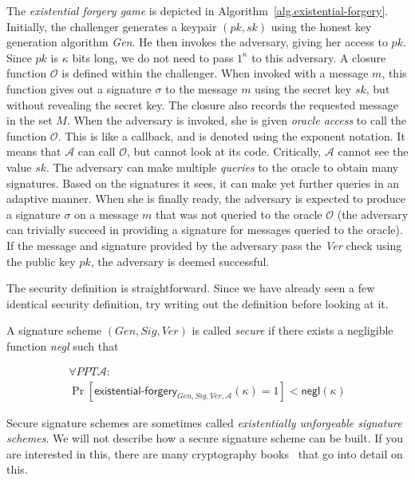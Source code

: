 The \emph{existential forgery game} is depicted in Algorithm~\ref{alg.existential-forgery}.
Initially, the challenger generates a keypair $(pk, sk)$ using the honest key generation
algorithm \emph{Gen}. He then invokes the adversary, giving her access to $pk$. Since
$pk$ is $\kappa$ bits long, we do not need to pass $1^\kappa$ to this adversary.
A closure function $\mathcal{O}$ is defined within the challenger. When invoked
with a message $m$, this function gives out a signature $\sigma$ to the message
$m$ using the secret key $sk$, but without revealing the secret key. The closure
also records the requested message in the set $M$.
When the adversary is invoked, she is given \emph{oracle access} to call the
function $\mathcal{O}$. This is like a callback, and is denoted using the
exponent notation. It means that $\mathcal{A}$ can call $\mathcal{O}$, but
cannot look at its code. Critically, $\mathcal{A}$ cannot see the value $sk$.
The adversary can make multiple \emph{queries} to the oracle to obtain many
signatures. Based on the signatures it sees, it can make yet further queries
in an adaptive manner. When she is finally ready, the adversary is expected
to produce a signature $\sigma$ on a message $m$ that was not queried to the
oracle $\mathcal{O}$ (the adversary can trivially succeed in providing a signature
for messages queried to the oracle). If the message and signature provided by
the adversary pass the \emph{Ver} check using the public key $pk$, the adversary
is deemed successful.

The security definition is straightforward. Since we have already seen a few
identical security definition, try writing out the definition before looking
at it.

\begin{definition}
  A signature scheme $(Gen, Sig, Ver)$ is called \emph{secure} if there
  exists a negligible function \emph{negl} such that

  \begin{align*}
    \forall PPT \mathcal{A}:\\
    \Pr[\textsf{existential-forgery}_{Gen, Sig, Ver, \mathcal{A}}(\kappa) = 1] < \textsf{negl}(\kappa)
  \end{align*}
\end{definition}

Secure signature schemes are sometimes called \emph{existentially unforgeable signature
schemes}. We will not describe how a secure signature scheme can be built. If you are
interested in this, there are many cryptography books~\cite{katz,foundations}
that go into detail on this.

